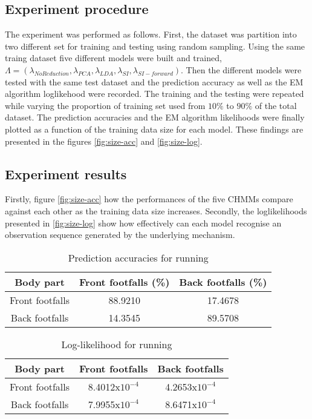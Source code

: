 \subsection{Experiment procedure}
The experiment was performed as follows.
First, the dataset was partition into two different set for training and testing using random sampling.
Using the same traing dataset five different models were built and trained, \(\Lambda = (\lambda_{No Reduction}, \lambda_{PCA}, \lambda_{LDA}, \lambda_{SI}, \lambda_{SI-forward})\).
Then the different models were tested with the same test dataset and the prediction accuracy as well as the EM algorithm loglikehood were recorded.
The training and the testing were repeated while varying the proportion of training set used from \(10\%\) to \(90\%\) of the total dataset.
The prediction accuracies and the EM algorithm likelihoods were finally plotted as a function of the training data size for each model.
These findings are presented in the figures \ref{fig:size-acc} and \ref{fig:size-log}. 

\subsection{Experiment results}
Firstly, figure \ref{fig:size-acc} how the performances of the five CHMMs compare against each other as the training data size increases.
Secondly, the loglikelihoods presented in \ref{fig:size-log} show how effectively can each model recognise an observation sequence generated by the underlying mechanism.

\begin{table}[h!] 
	\centering
	\begin{tabular}{ |c|c|c|} 	
		\hline	
		\textbf{Body part} & \textbf{Front footfalls (\%)} &  \textbf{Back footfalls (\%)}\\ 
		\hline
		Front footfalls & 88.9210 & 17.4678\\ 
		\hline
		Back footfalls & 14.3545 & 89.5708 \\ 
		\hline	   	
	\end{tabular}
	\caption{Prediction accuracies for running}
	\label{tab:front-back-run-acc}
\end{table}

\begin{table}[h!] 
	\centering
	\begin{tabular}{ |c|c|c|} 	
		\hline	
		\textbf{Body part} & \textbf{Front footfalls} &  \textbf{Back footfalls}\\ 
		\hline
		Front footfalls &  8.4012x\(10^{-4}\) & 4.2653x\(10^{-4}\)\\ 
		\hline
		Back footfalls & 7.9955x\(10^{-4}\) & 8.6471x\(10^{-4}\) \\ 
		\hline	   	
	\end{tabular}
	\caption{Log-likelihood for running}
	\label{tab:front-back-run-log}
\end{table}



